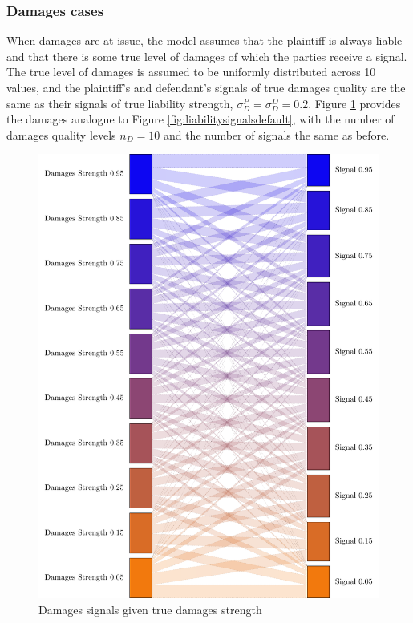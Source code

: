 \documentclass{article}
\begin{document}
\subsubsection{Damages cases}

When damages are at issue, the model assumes that the plaintiff is always liable and that there is some true level of damages of which the parties receive a signal. The true level of damages is assumed to be uniformly distributed across 10 values, and the plaintiff's and defendant's signals of true damages quality are the same as their signals of true liability strength, $\sigma_{D}^P=\sigma_{D}^D=0.2$. Figure \ref{fig:damagessignals} provides the damages analogue to Figure \ref{fig:liabilitysignalsdefault}, with the number of damages quality levels $n_{D} = 10$ and the number of signals the same as before.

\begin{figure}[h!]
\centering
\includegraphics[scale=0.4, trim={0in 0in 0in 0in}, clip]{../Figures/damages signals.pdf}
\caption{Damages signals given true damages strength}
\label{fig:damagessignals}
\end{figure}
\end{document}
